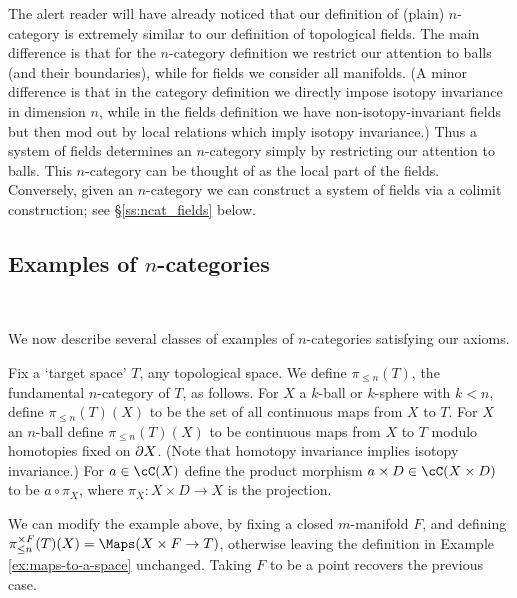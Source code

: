 \medskip

The alert reader will have already noticed that our definition of (plain) $n$-category
is extremely similar to our definition of topological fields.
The main difference is that for the $n$-category definition we restrict our attention to balls
(and their boundaries), while for fields we consider all manifolds.
(A minor difference is that in the category definition we directly impose isotopy
invariance in dimension $n$, while in the fields definition we have non-isotopy-invariant fields
but then mod out by local relations which imply isotopy invariance.)
Thus a system of fields determines an $n$-category simply by restricting our attention to
balls.
This $n$-category can be thought of as the local part of the fields.
Conversely, given an $n$-category we can construct a system of fields via 
a colimit construction; see \S \ref{ss:ncat_fields} below.


\medskip

\subsection{Examples of $n$-categories}\ \


We now describe several classes of examples of $n$-categories satisfying our axioms.

\begin{example}
\rm
\label{ex:maps-to-a-space}%
Fix a `target space' $T$, any topological space. We define $\pi_{\leq n}(T)$, the fundamental $n$-category of $T$, as follows.
For $X$ a $k$-ball or $k$-sphere with $k < n$, define $\pi_{\leq n}(T)(X)$ to be the set of 
all continuous maps from $X$ to $T$.
For $X$ an $n$-ball define $\pi_{\leq n}(T)(X)$ to be continuous maps from $X$ to $T$ modulo
homotopies fixed on $\partial X$.
(Note that homotopy invariance implies isotopy invariance.)
For $a\in \cC(X)$ define the product morphism $a\times D \in \cC(X\times D)$ to
be $a\circ\pi_X$, where $\pi_X : X\times D \to X$ is the projection.
\end{example}

\begin{example}
\rm
\label{ex:maps-to-a-space-with-a-fiber}%
We can modify the example above, by fixing a
closed $m$-manifold $F$, and defining $\pi^{\times F}_{\leq n}(T)(X) = \Maps(X \times F \to T)$, otherwise leaving the definition in Example \ref{ex:maps-to-a-space} unchanged. Taking $F$ to be a point recovers the previous case.
\end{example}

